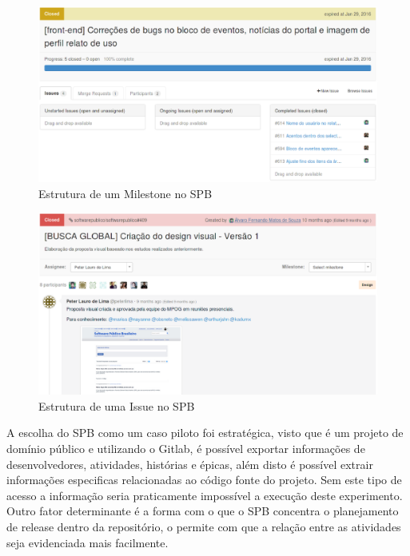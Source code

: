 \newpage
\begin{figure}[h]
    \centering
        \includegraphics[keepaspectratio=true,scale=0.5]{figuras/milestone.eps}
    \caption{Estrutura de um Milestone no SPB}
    \label{fig:milestone}
\end{figure}


\begin{figure}[h]
    \centering
        \includegraphics[keepaspectratio=true,scale=0.5]{figuras/issue.eps}
    \caption{Estrutura de uma Issue no SPB}
    \label{fig:issue}
\end{figure}

A escolha do SPB como um caso piloto foi estratégica, visto que é um projeto de domínio público e utilizando o Gitlab, é possível exportar informações de desenvolvedores, atividades, histórias e épicas, além disto é possível extrair informações especificas relacionadas ao código fonte do projeto. Sem este tipo de acesso a informação seria praticamente impossível a execução deste experimento. Outro fator determinante é a forma com o que o SPB concentra o planejamento de release dentro da repositório, o permite com que a relação entre as atividades seja evidenciada mais facilmente.

